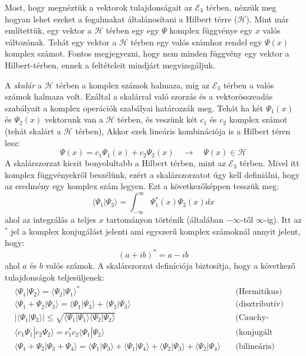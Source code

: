 \documentclass[../main.tex]{subfiles}
\begin{document}
Most, hogy megnéztük a vektorok tulajdonságait az $\mathcal{E}_3$ térben, nézzük meg hogyan lehet ezeket a fogalmakat általánosítani a Hilbert térre ($\mathcal{H}$). Mint már említettük,
egy vektor a $\mathcal{H}$ térben egy egy $\Psi$ komplex függvénye egy $x$ valós változónak. Tehát egy vektor a $\mathcal{H}$ térben egy valós számhoz rendel egy $\Psi(x)$ komplex számot.
Fontos megjegyezni, hogy nem minden függvény egy vektor a Hilbert-térben, ennek a feltételeit mindjárt megvizsgáljuk.

A \textit{skalár} a $\mathcal{H}$ térben a komplex számok halmaza, míg az $\mathcal{E}_3$ térben a valós számok halmaza volt. Ezáltal a skalárral való szorzás és a vektorösszeadás szabályait
a komplex operációk szabályai határozzák meg. Tehát ha két $\Psi_1(x)$ és $\Psi_2(x)$ vektorunk van a $\mathcal{H}$ térben, és veszünk két $c_1$ és $c_2$ komplex számot (tehát skalárt a $\mathcal{H}$ térben),
Akkor ezek lineáris kombinációja is a Hilbert téren lesz:
\begin{equation}
    \Psi(x) = c_1 \Psi_1(x) + c_2 \Psi_2(x) \quad \rightarrow \quad \Psi(x) \in \mathcal{H}
\end{equation}
A skalárszorzat kicsit bonyolultabb a Hilbert térben, mint az $\mathcal{E}_3$ térben. Mivel itt komplex függvényekről beszélünk, ezért a skalárszorzatot úgy kell definiálni, hogy az eredmény egy komplex szám legyen. Ezt a következőképpen tesszük meg:
\begin{equation}
    \langle \Psi_1 | \Psi_2 \rangle = \int_{-\infty}^{\infty} \Psi_1^*(x) \Psi_2(x) dx
\end{equation}
ahol az integrálás a teljes $x$ tartományon történik (általában $-\infty$-től $\infty$-ig). Itt az $^*$ jel a komplex konjugálást jelenti ami egyszerű komplex számoknál annyit jelent, hogy:
\begin{equation}
    (a + ib)^* = a - ib
\end{equation}
ahol $a$ és $b$ valós számok. A skalárszorzat definíciója biztosítja, hogy a következő tulajdonságok teljesüljenek:
\begin{equation}
    \begin{aligned}
        &\langle \Psi_1 | \Psi_2 \rangle = \langle \Psi_2 | \Psi_1 \rangle^* \quad &\text{(Hermitikus)}\\
        &\langle \Psi_1 + \Psi_2 | \Psi_3 \rangle = \langle \Psi_1 | \Psi_3 \rangle + \langle \Psi_2 | \Psi_3 \rangle \quad &\text{(disztributív)}\\
        &|\langle \Psi_1 | \Psi_2 \rangle| \leq \sqrt{\langle \Psi_1 | \Psi_1 \rangle \langle \Psi_2 | \Psi_2 \rangle} \quad &\text{(Cauchy-Schwarz egyenlőtlenség)} \\
        &\langle c_1 \Psi_1 | c_2 \Psi_2 \rangle = c_1^* c_2 \langle \Psi_1 | \Psi_2 \rangle \quad &\text{(konjugált homogén)} \\
        &\langle \Psi_1 + \Psi_2 | \Psi_3 + \Psi_4 \rangle = \langle \Psi_1 | \Psi_3 \rangle + \langle \Psi_1 | \Psi_4 \rangle + \langle \Psi_2 | \Psi_3 \rangle + \langle \Psi_2 | \Psi_4 \rangle \quad &\text{(bilineáris)}
    \end{aligned}
\end{equation}
\end{document}
